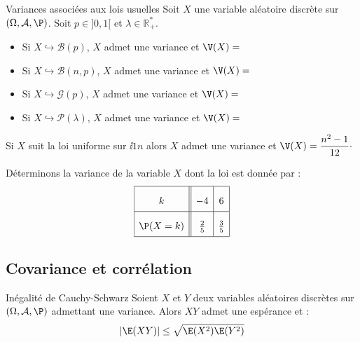 \documentclass[french,11pt,twoside]{VcCours}
\begin{document}
\begin{Theoreme}{Variances associées aux lois usuelles}
Soit $X$ une variable aléatoire discrète sur $(\Omega, \mathcal{A}, \P)$. Soit $p \in ]0,1[$ et $\lambda \in \mathbb{R}_+^{*}$.

\begin{itemize}
\item Si $X \hookrightarrow \mathcal{B}(p)$, $X$ admet une variance et $\V(X)=$
\item Si $X \hookrightarrow \mathcal{B}(n,p)$, $X$ admet une variance et $\V(X)=$
\item Si $X \hookrightarrow \mathcal{G}(p)$, $X$ admet une variance et $\V(X)= $
\item Si $X \hookrightarrow \mathcal{P}(\lambda)$, $X$ admet une variance et $\V(X)= $
\end{itemize}
\end{Theoreme}

\begin{Demonstration}{}

\vspace*{15cm}
\end{Demonstration}

\begin{Remarque}{} Si $X$ suit la loi uniforme sur $\ii{1}{n}$ alors $X$ admet une variance et $\V(X) = \dfrac{n^2-1}{12} \cdot$
\end{Remarque} 

\begin{Exemple}{} Déterminons la variance de la variable $X$ dont la loi est donnée par :
$$\renewcommand{\arraystretch}{2.1}\begin{array}{|c||c|c|}
\hline
k & -4 & 6\\
\hline
\P(X=k) & \frac 2 5 & \frac 3 5\\
\hline
\end{array}$$

\vspace*{4cm}
\end{Exemple}

\subsection{Covariance et corrélation}

\begin{Proposition}{Inégalité de Cauchy-Schwarz}
Soient $X$ et $Y$ deux variables aléatoires discrètes sur $(\Omega, \mathcal{A}, \P)$ admettant une variance. Alors $XY$ admet une espérance et :
$$ \vert \E(XY) \vert \leq \sqrt{\E(X^2)\E(Y^2)}$$
\end{Proposition}
\end{document}

